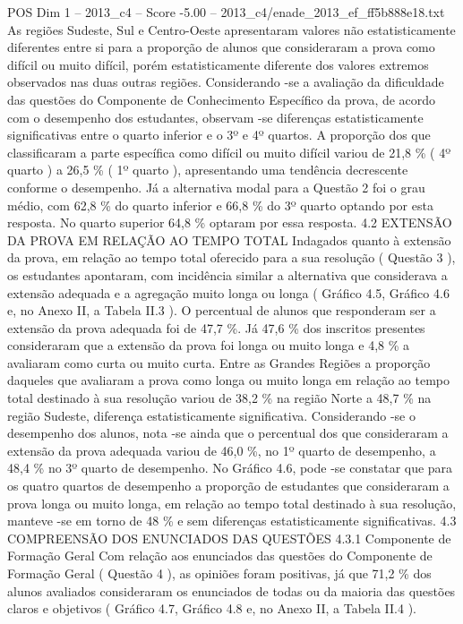 \begin{textsample}{POS Dim 1 – 2013\_c4 – Score -5.00 – 2013\_c4/enade\_2013\_ef\_ff5b888e18.txt}
As regiões Sudeste, Sul e Centro-Oeste apresentaram valores não estatisticamente diferentes entre si para a proporção de alunos que consideraram a prova como difícil ou muito difícil, porém estatisticamente diferente dos valores extremos observados nas duas outras regiões.
Considerando -se a avaliação da dificuldade das questões do Componente de Conhecimento Específico da prova, de acordo com o desempenho dos estudantes, observam -se diferenças estatisticamente significativas entre o quarto inferior e o 3º e 4º quartos.
A proporção dos que classificaram a parte específica como difícil ou muito difícil variou de 21,8 \% ( 4º quarto ) a 26,5 \% ( 1º quarto ), apresentando uma tendência decrescente conforme o desempenho.
Já a alternativa modal para a Questão 2 foi o grau médio, com 62,8 \% do quarto inferior e 66,8 \% do 3º quarto optando por esta resposta.
No quarto superior 64,8 \% optaram por essa resposta. 4.2 EXTENSÃO DA PROVA EM RELAÇÃO AO TEMPO TOTAL Indagados quanto à extensão da prova, em relação ao tempo total oferecido para a sua resolução ( Questão 3 ), os estudantes apontaram, com incidência similar a alternativa que considerava a extensão adequada e a agregação muito longa ou longa ( Gráfico 4.5, Gráfico 4.6 e, no Anexo II, a Tabela II.3 ).
O percentual de alunos que responderam ser a extensão da prova adequada foi de 47,7 \%.
Já 47,6 \% dos inscritos presentes consideraram que a extensão da prova foi longa ou muito longa e 4,8 \% a avaliaram como curta ou muito curta.
Entre as Grandes Regiões a proporção daqueles que avaliaram a prova como longa ou muito longa em relação ao tempo total destinado à sua resolução variou de 38,2 \% na região Norte a 48,7 \% na região Sudeste, diferença estatisticamente significativa.
Considerando -se o desempenho dos alunos, nota -se ainda que o percentual dos que consideraram a extensão da prova adequada variou de 46,0 \%, no 1º quarto de desempenho, a 48,4 \% no 3º quarto de desempenho.
No Gráfico 4.6, pode -se constatar que para os quatro quartos de desempenho a proporção de estudantes que consideraram a prova longa ou muito longa, em relação ao tempo total destinado à sua resolução, manteve -se em torno de 48 \% e sem diferenças estatisticamente significativas. 4.3 COMPREENSÃO DOS ENUNCIADOS DAS QUESTÕES 4.3.1 Componente de Formação Geral Com relação aos enunciados das questões do Componente de Formação Geral ( Questão 4 ), as opiniões foram positivas, já que 71,2 \% dos alunos avaliados consideraram os enunciados de todas ou da maioria das questões claros e objetivos ( Gráfico 4.7, Gráfico 4.8 e, no Anexo II, a Tabela II.4 ).

\end{textsample}
